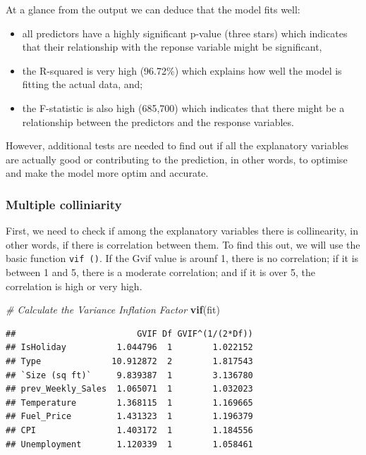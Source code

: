 \documentclass[11pt,]{article}
\newenvironment{Shaded}{\begin{snugshade}}{\end{snugshade}}
\newcommand{\KeywordTok}[1]{\textcolor[rgb]{0.13,0.29,0.53}{\textbf{{#1}}}}
\newcommand{\CommentTok}[1]{\textcolor[rgb]{0.56,0.35,0.01}{\textit{{#1}}}}
\newcommand{\NormalTok}[1]{{#1}}
\begin{document}
At a glance from the output we can deduce that the model fits well:

\begin{itemize}
\item
  all predictors have a highly significant p-value (three stars) which
  indicates that their relationship with the reponse variable might be
  significant,
\item
  the R-squared is very high (96.72\%) which explains how well the model
  is fitting the actual data, and;
\item
  the F-statistic is also high (685,700) which indicates that there
  might be a relationship between the predictors and the response
  variables.
\end{itemize}

However, additional tests are needed to find out if all the explanatory
variables are actually good or contributing to the prediction, in other
words, to optimise and make the model more optim and accurate.

\subsubsection{Multiple colliniarity}\label{multiple-colliniarity}

First, we need to check if among the explanatory variables there is
collinearity, in other words, if there is correlation between them. To
find this out, we will use the basic function \texttt{vif\ ()}. If the
Gvif value is arounf 1, there is no correlation; if it is between 1 and
5, there is a moderate correlation; and if it is over 5, the correlation
is high or very high.

\begin{Shaded}
\begin{Highlighting}[]
\CommentTok{# Calculate the Variance Inflation Factor}
\KeywordTok{vif}\NormalTok{(fit)}
\end{Highlighting}
\end{Shaded}

\begin{verbatim}
##                        GVIF Df GVIF^(1/(2*Df))
## IsHoliday          1.044796  1        1.022152
## Type              10.912872  2        1.817543
## `Size (sq ft)`     9.839387  1        3.136780
## prev_Weekly_Sales  1.065071  1        1.032023
## Temperature        1.368115  1        1.169665
## Fuel_Price         1.431323  1        1.196379
## CPI                1.403172  1        1.184556
## Unemployment       1.120339  1        1.058461
\end{verbatim}
\end{document}
